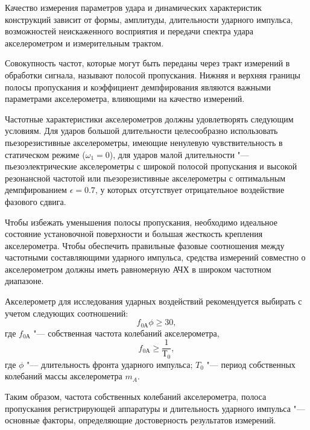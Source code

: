 Качество измерения параметров удара и динамических характеристик конструкций зависит от формы, амплитуды, длительности ударного импульса, возможностей неискаженного восприятия и передачи спектра удара акселерометром и измерительным трактом.

Совокупность частот, которые могут быть переданы через тракт измерений в обработки сигнала, называют полосой пропускания.
Нижняя и верхняя границы полосы пропускания и коэффициент демпфирования являются важными параметрами акселерометра, влияющими на качество измерений.

Частотные характеристики акселерометров должны удовлетворять следующим условиям.
Для ударов большой длительности целесообразно использовать пьезорезистивные акселерометры, имеющие ненулевую чувствительность в статическом режиме ($\omega_1 = 0$), для ударов малой длительности "--- пьезоэлектрические акселерометры с широкой полосой пропускания и высокой резонансной частотой или пьезорезистивные акселерометры с оптимальным демпфированием $\epsilon = 0.7$, у которых отсутствует отрицательное воздействие фазового сдвига.

Чтобы избежать уменьшения полосы пропускания, необходимо идеальное состояние установочной поверхности и большая жесткость крепления акселерометра.
Чтобы обеспечить правильные фазовые соотношения между частотными составляющими ударного импульса, средства измерений совместно о акселерометром должны иметь равномерную АЧХ в широком частотном диапазоне.

Акселерометр для исследования ударных воздействий рекомендуется выбирать с учетом следующих соотношений:
\[
    f_{0А} \phi \ge 30,
\]
где $f_{0А}$ "--- собственная частота колебаний акселерометра,
\[
    f_{0А} \ge \frac{1}{Т_0},
\]
где $\phi$ "--- длительность фронта ударного импульса; $T_0$ "--- период собственных колебаний массы акселерометра $m_{A}$.

Таким образом, частота собственных колебаний акселерометра, полоса пропускания регистрирующей аппаратуры и длительность ударного импульса "--- основные факторы, определяющие достоверность результатов измерений.

